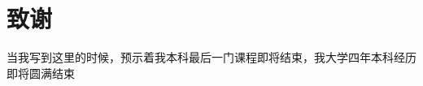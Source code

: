 \titleformat{\chapter}{\centering\xiaosan\hei}{\chaptername}{2em}{} %




\chapter*{致\qquad 谢}

当我写到这里的时候，预示着我本科最后一门课程即将结束，我大学四年本科经历即将圆满结束


\clearpage